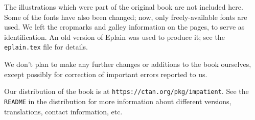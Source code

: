The illustrations which were part of the original book are not included
here.  Some of the fonts have also been changed; now, only
freely-available fonts are used.  We left the cropmarks and galley
information on the pages, to serve as identification.  An old version of
Eplain was used to produce it; see the {\tt eplain.tex} file for
details.

We don't plan to make any further changes or additions to the book
ourselves, except possibly for correction of important errors reported
to us.

Our distribution of the book is at {\tt https://ctan.org/pkg/impatient}.
See the {\tt README} in the distribution for more information about
different versions, translations, contact information, etc.

\pagebreak
\byebye
